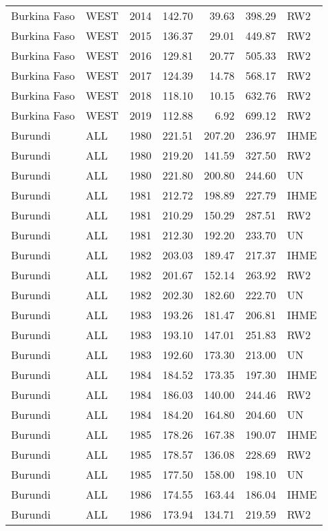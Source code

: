 \begin{longtable}{lllrrrl}
  Burkina Faso & WEST & 2014 & 142.70 & 39.63 & 398.29 & RW2 \\ 
  Burkina Faso & WEST & 2015 & 136.37 & 29.01 & 449.87 & RW2 \\ 
  Burkina Faso & WEST & 2016 & 129.81 & 20.77 & 505.33 & RW2 \\ 
  Burkina Faso & WEST & 2017 & 124.39 & 14.78 & 568.17 & RW2 \\ 
  Burkina Faso & WEST & 2018 & 118.10 & 10.15 & 632.76 & RW2 \\ 
  Burkina Faso & WEST & 2019 & 112.88 & 6.92 & 699.12 & RW2 \\ 
  Burundi & ALL & 1980 & 221.51 & 207.20 & 236.97 & IHME \\ 
  Burundi & ALL & 1980 & 219.20 & 141.59 & 327.50 & RW2 \\ 
  Burundi & ALL & 1980 & 221.80 & 200.80 & 244.60 & UN \\ 
  Burundi & ALL & 1981 & 212.72 & 198.89 & 227.79 & IHME \\ 
  Burundi & ALL & 1981 & 210.29 & 150.29 & 287.51 & RW2 \\ 
  Burundi & ALL & 1981 & 212.30 & 192.20 & 233.70 & UN \\ 
  Burundi & ALL & 1982 & 203.03 & 189.47 & 217.37 & IHME \\ 
  Burundi & ALL & 1982 & 201.67 & 152.14 & 263.92 & RW2 \\ 
  Burundi & ALL & 1982 & 202.30 & 182.60 & 222.70 & UN \\ 
  Burundi & ALL & 1983 & 193.26 & 181.47 & 206.81 & IHME \\ 
  Burundi & ALL & 1983 & 193.10 & 147.01 & 251.83 & RW2 \\ 
  Burundi & ALL & 1983 & 192.60 & 173.30 & 213.00 & UN \\ 
  Burundi & ALL & 1984 & 184.52 & 173.35 & 197.30 & IHME \\ 
  Burundi & ALL & 1984 & 186.03 & 140.00 & 244.46 & RW2 \\ 
  Burundi & ALL & 1984 & 184.20 & 164.80 & 204.60 & UN \\ 
  Burundi & ALL & 1985 & 178.26 & 167.38 & 190.07 & IHME \\ 
  Burundi & ALL & 1985 & 178.57 & 136.08 & 228.69 & RW2 \\ 
  Burundi & ALL & 1985 & 177.50 & 158.00 & 198.10 & UN \\ 
  Burundi & ALL & 1986 & 174.55 & 163.44 & 186.04 & IHME \\ 
  Burundi & ALL & 1986 & 173.94 & 134.71 & 219.59 & RW2 \\ 

\end{longtable}
